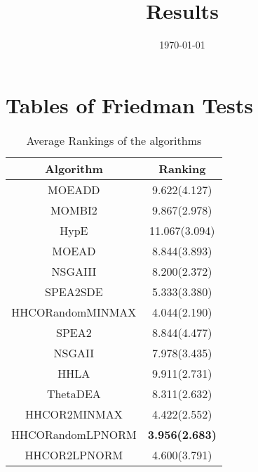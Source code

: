 \documentclass{article}
\title{Results}
\author{}
\date{\today}
\begin{document}
\oddsidemargin 0in \topmargin 0in\maketitle
\section{Tables of Friedman Tests}
\begin{table}[!htp]
\centering
\caption{Average Rankings of the algorithms
}\begin{tabular}{|c|c|}
\hline
Algorithm&Ranking\\
\hline
MOEADD&9.622(4.127)\\\hline
MOMBI2&9.867(2.978)\\\hline
HypE&11.067(3.094)\\\hline
MOEAD&8.844(3.893)\\\hline
NSGAIII&8.200(2.372)\\\hline
SPEA2SDE&5.333(3.380)\\\hline
HHCORandomMINMAX&4.044(2.190)\\\hline
SPEA2&8.844(4.477)\\\hline
NSGAII&7.978(3.435)\\\hline
HHLA&9.911(2.731)\\\hline
ThetaDEA&8.311(2.632)\\\hline
HHCOR2MINMAX&4.422(2.552)\\\hline
HHCORandomLPNORM& {\bf 3.956(2.683)}\\\hline
HHCOR2LPNORM&4.600(3.791)\\\hline
\end{tabular}
\end{table}
\end{document}
